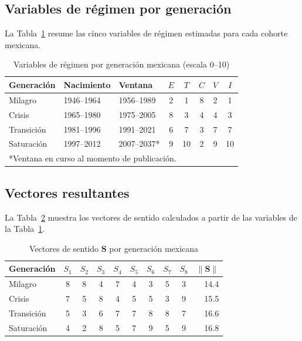 \documentclass[conference,spanish]{IEEEtran}
\begin{document}
\subsection{Variables de régimen por generación}

La Tabla~\ref{tab:variables} resume las cinco variables de régimen estimadas para cada cohorte mexicana.

\begin{table}[htbp]
\caption{Variables de régimen por generación mexicana (escala 0--10)}
\label{tab:variables}
\begin{tabular}{lllccccc}
\toprule
Generación & Nacimiento & Ventana & $E$ & $T$ & $C$ & $V$ & $I$ \\
\midrule
Milagro    & 1946--1964 & 1956--1989 & 2 & 1 & 8 & 2 & 1 \\
Crisis     & 1965--1980 & 1975--2005 & 8 & 3 & 4 & 4 & 3 \\
Transición & 1981--1996 & 1991--2021 & 6 & 7 & 3 & 7 & 7 \\
Saturación & 1997--2012 & 2007--2037* & 9 & 10 & 2 & 9 & 10 \\
\bottomrule
\multicolumn{8}{l}{*Ventana en curso al momento de publicación.}
\end{tabular}
\end{table}

\subsection{Vectores resultantes}

La Tabla~\ref{tab:vectores} muestra los vectores de sentido calculados a partir de las variables de la Tabla~\ref{tab:variables}.

\begin{table}[htbp]
\caption{Vectores de sentido $\mathbf{S}$ por generación mexicana}
\label{tab:vectores}
\begin{tabular}{lccccccccr}
\toprule
Generación & $S_1$ & $S_2$ & $S_3$ & $S_4$ & $S_5$ & $S_6$ & $S_7$ & $S_8$ & $\|\mathbf{S}\|$ \\
\midrule
Milagro    & 8 & 8 & 4 & 7 & 4 & 3 & 5 & 3 & 14.4 \\
Crisis     & 7 & 5 & 8 & 4 & 5 & 5 & 3 & 9 & 15.5 \\
Transición & 5 & 3 & 6 & 7 & 7 & 8 & 8 & 7 & 16.6 \\
Saturación & 4 & 2 & 8 & 5 & 7 & 9 & 5 & 9 & 16.8 \\
\bottomrule
\end{tabular}
\end{table}
\end{document}
